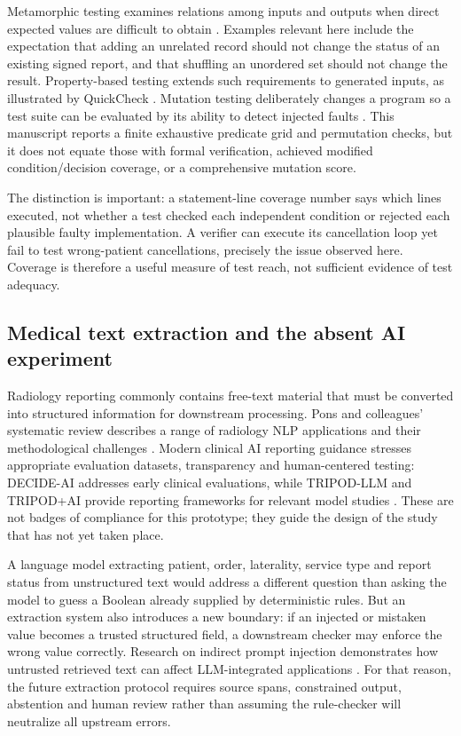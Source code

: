 \documentclass[11pt,twocolumn]{article}
\begin{document}
Metamorphic testing examines relations among inputs and outputs when direct expected values are difficult to obtain \cite{chen2018}. Examples relevant here include the expectation that adding an unrelated record should not change the status of an existing signed report, and that shuffling an unordered set should not change the result. Property-based testing extends such requirements to generated inputs, as illustrated by QuickCheck \cite{claessen2000}. Mutation testing deliberately changes a program so a test suite can be evaluated by its ability to detect injected faults \cite{jia2011}. This manuscript reports a finite exhaustive predicate grid and permutation checks, but it does not equate those with formal verification, achieved modified condition/decision coverage, or a comprehensive mutation score.

The distinction is important: a statement-line coverage number says which lines executed, not whether a test checked each independent condition or rejected each plausible faulty implementation. A verifier can execute its cancellation loop yet fail to test wrong-patient cancellations, precisely the issue observed here. Coverage is therefore a useful measure of test reach, not sufficient evidence of test adequacy.

\subsection{Medical text extraction and the absent AI experiment}
Radiology reporting commonly contains free-text material that must be converted into structured information for downstream processing. Pons and colleagues' systematic review describes a range of radiology NLP applications and their methodological challenges \cite{pons2016}. Modern clinical AI reporting guidance stresses appropriate evaluation datasets, transparency and human-centered testing: DECIDE-AI addresses early clinical evaluations, while TRIPOD-LLM and TRIPOD+AI provide reporting frameworks for relevant model studies \cite{decide2022,tripodllm2025,tripodai2024}. These are not badges of compliance for this prototype; they guide the design of the study that has not yet taken place.

A language model extracting patient, order, laterality, service type and report status from unstructured text would address a different question than asking the model to guess a Boolean already supplied by deterministic rules. But an extraction system also introduces a new boundary: if an injected or mistaken value becomes a trusted structured field, a downstream checker may enforce the wrong value correctly. Research on indirect prompt injection demonstrates how untrusted retrieved text can affect LLM-integrated applications \cite{greshake2023}. For that reason, the future extraction protocol requires source spans, constrained output, abstention and human review rather than assuming the rule-checker will neutralize all upstream errors.
\end{document}
